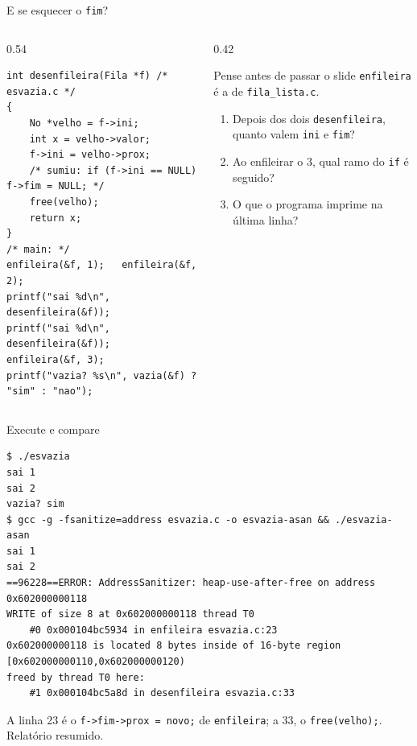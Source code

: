 \documentclass[aspectratio=169]{beamer}
\begin{document}
\begin{frame}[fragile]{E se esquecer o \texttt{fim}?}
  \begin{columns}[c]
    \begin{column}{0.54\textwidth}
\begin{lstlisting}[style=codC]
int desenfileira(Fila *f) /* esvazia.c */
{
    No *velho = f->ini;
    int x = velho->valor;
    f->ini = velho->prox;
    /* sumiu: if (f->ini == NULL) f->fim = NULL; */
    free(velho);
    return x;
}
/* main: */
enfileira(&f, 1);   enfileira(&f, 2);
printf("sai %d\n", desenfileira(&f));
printf("sai %d\n", desenfileira(&f));
enfileira(&f, 3);
printf("vazia? %s\n", vazia(&f) ? "sim" : "nao");
\end{lstlisting}
    \end{column}
    \begin{column}{0.42\textwidth}
      \begin{block}{Pense antes de passar o slide}
        \small \texttt{enfileira} é a de \texttt{fila\_lista.c}.
        \begin{enumerate}
          \item Depois dos dois \texttt{desenfileira}, quanto valem
            \texttt{ini} e \texttt{fim}?
          \item Ao enfileirar o 3, qual ramo do \texttt{if} é seguido?
          \item O que o programa imprime na última linha?
        \end{enumerate}
      \end{block}
    \end{column}
  \end{columns}
\end{frame}

\begin{frame}[fragile]{Execute e compare}
\begin{lstlisting}[style=shellStyle]
$ ./esvazia
sai 1
sai 2
vazia? sim
$ gcc -g -fsanitize=address esvazia.c -o esvazia-asan && ./esvazia-asan
sai 1
sai 2
==96228==ERROR: AddressSanitizer: heap-use-after-free on address 0x602000000118
WRITE of size 8 at 0x602000000118 thread T0
    #0 0x000104bc5934 in enfileira esvazia.c:23
0x602000000118 is located 8 bytes inside of 16-byte region [0x602000000110,0x602000000120)
freed by thread T0 here:
    #1 0x000104bc5a8d in desenfileira esvazia.c:33
\end{lstlisting}
  \begin{center}
    \scriptsize\textcolor{UFSGray}{A linha 23 é o \texttt{f->fim->prox = novo;}
    de \texttt{enfileira}; a 33, o \texttt{free(velho);}. Relatório resumido.}
  \end{center}
\end{frame}
\end{document}
